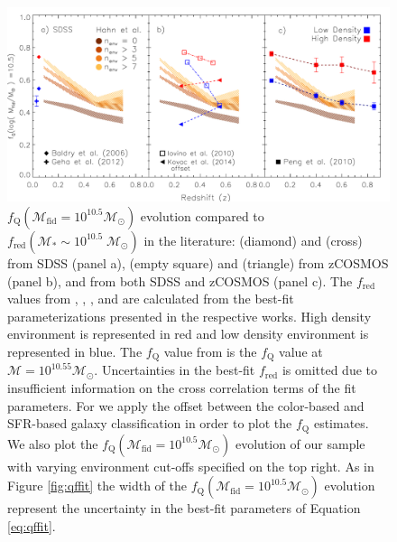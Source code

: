 \def \iovinopanel {b}
\def \kovacpanel {b}
\def \pengpanel {c}
\begin{figure}
\begin{center}
\includegraphics[width=\textwidth]{figs/qfenv/fig6.pdf}
\caption{$f_{\mathrm{Q}}(\mathcal{M}_{\mathrm{fid}}=10^{10.5} \mathcal{M}_\odot)$ evolution compared to $f_{\mathrm{red}}(\mathcal{M}_{*} \sim 10^{10.5} \; \mathcal{M}_{\odot})$ in the literature: \cite{Baldry:2006aa} (diamond) and \cite{geha12a} (cross) from SDSS (panel a), \cite{Iovino:2010aa} (empty square) and \cite{Kovac:2014aa} (triangle) from zCOSMOS (panel \kovacpanel), and \cite{Peng:2010aa} from both SDSS and zCOSMOS (panel \pengpanel). The $f_{\mathrm{red}}$ values from \cite{Iovino:2010aa}, \cite{Kovac:2014aa}, \cite{Baldry:2006aa}, and \cite{Peng:2010aa} are calculated from the best-fit parameterizations presented in the respective works. High density environment is represented in red and low density environment is represented in blue. The $f_{\mathrm{Q}}$ value from \cite{geha12a} is the $f_{\mathrm{Q}}$ value at $\mathcal{M} = 10^{10.55} \mathcal{M}_{\odot}$. Uncertainties in the \cite{Iovino:2010aa} best-fit $f_{\mathrm{red}}$ is omitted due to insufficient information on the cross correlation terms of the fit parameters. For \cite{Kovac:2014aa} we apply the offset between the color-based and SFR-based galaxy classification in order to plot the $f_{\mathrm{Q}}$ estimates. We also plot the $f_{\mathrm{Q}}(\mathcal{M}_{\mathrm{fid}} = 10^{10.5} \mathcal{M}_\odot)$ evolution of our sample with varying environment cut-offs specified on the top right. As in Figure \ref{fig:qffit} the width of the $f_{\mathrm{Q}}(\mathcal{M}_{\mathrm{fid}} = 10^{10.5} \mathcal{M}_\odot)$ evolution represent the uncertainty in the best-fit parameters of Equation \ref{eq:qffit}.}         \label{fig:qffit_comp}
\end{center}
\end{figure}

